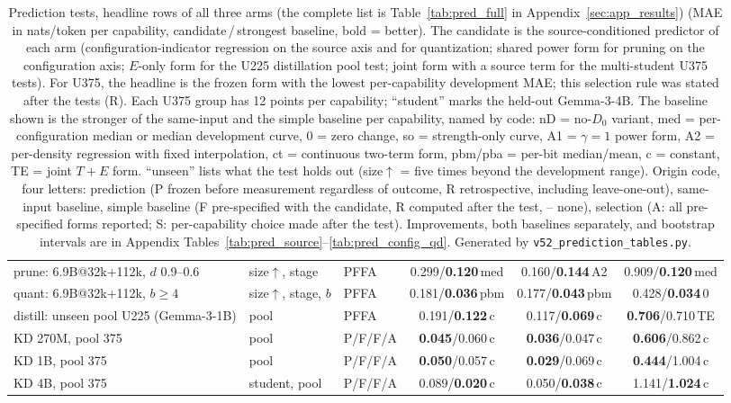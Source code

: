 \begin{table}[!t]
\begin{tabular}{@{}>{\raggedright\arraybackslash}p{4.15cm}>{\raggedright\arraybackslash}p{1.4cm}lccc@{}}
prune: 6.9B@32k+112k, $d$ 0.9--0.6 & size$\uparrow$, stage & PFFA & 0.299/\textbf{0.120}{\scriptsize\,med} & 0.160/\textbf{0.144}{\scriptsize\,A2} & 0.909/\textbf{0.120}{\scriptsize\,med} \\
\addlinespace[1.5pt]
quant: 6.9B@32k+112k, $b\ge4$ & size$\uparrow$, stage, $b$ & PFFA & 0.181/\textbf{0.036}{\scriptsize\,pbm} & 0.177/\textbf{0.043}{\scriptsize\,pbm} & 0.428/\textbf{0.034}{\scriptsize\,0} \\
\addlinespace[1.5pt]
distill: unseen pool U225 (Gemma-3-1B) & pool & PFFA & 0.191/\textbf{0.122}{\scriptsize\,c} & 0.117/\textbf{0.069}{\scriptsize\,c} & \textbf{0.706}/0.710{\scriptsize\,TE} \\
\addlinespace[1.5pt]
KD 270M, pool 375 & pool & P/F/F/A & \textbf{0.045}/0.060{\scriptsize\,c} & \textbf{0.036}/0.047{\scriptsize\,c} & \textbf{0.606}/0.862{\scriptsize\,c} \\
KD 1B, pool 375 & pool & P/F/F/A & \textbf{0.050}/0.057{\scriptsize\,c} & \textbf{0.029}/0.069{\scriptsize\,c} & \textbf{0.444}/1.004{\scriptsize\,c} \\
KD 4B, pool 375 & student, pool & P/F/F/A & 0.089/\textbf{0.020}{\scriptsize\,c} & 0.050/\textbf{0.038}{\scriptsize\,c} & 1.141/\textbf{1.024}{\scriptsize\,c} \\
\bottomrule\end{tabular}
\caption{\scriptsize Prediction tests, headline rows of all three arms (the complete list is Table~\ref{tab:pred_full} in Appendix~\ref{sec:app_results}) (MAE in nats/token per capability, candidate\,/\,strongest baseline, bold = better). The candidate is the source-conditioned predictor of each arm (configuration-indicator regression on the source axis and for quantization; shared power form for pruning on the configuration axis; $E$-only form for the U225 distillation pool test; joint form with a source term for the multi-student U375 tests). For U375, the headline is the frozen form with the lowest per-capability development MAE; this selection rule was stated after the tests (R). Each U375 group has 12 points per capability; ``student'' marks the held-out Gemma-3-4B. The baseline shown is the stronger of the same-input and the simple baseline per capability, named by code: nD = no-$D_0$ variant, med = per-configuration median or median development curve, 0 = zero change, so = strength-only curve, A1 = $\gamma{=}1$ power form, A2 = per-density regression with fixed interpolation, ct = continuous two-term form, pbm/pba = per-bit median/mean, c = constant, TE = joint $T{+}E$ form. ``unseen'' lists what the test holds out (size$\uparrow$ = five times beyond the development range). Origin code, four letters: prediction (P frozen before measurement regardless of outcome, R retrospective, including leave-one-out), same-input baseline, simple baseline (F pre-specified with the candidate, R computed after the test, -- none), selection (A: all pre-specified forms reported; S: per-capability choice made after the test). Improvements, both baselines separately, and bootstrap intervals are in Appendix Tables~\ref{tab:pred_source}--\ref{tab:pred_config_qd}. Generated by \texttt{v52\_prediction\_tables.py}.}
\label{tab:pred_main}\end{table}
